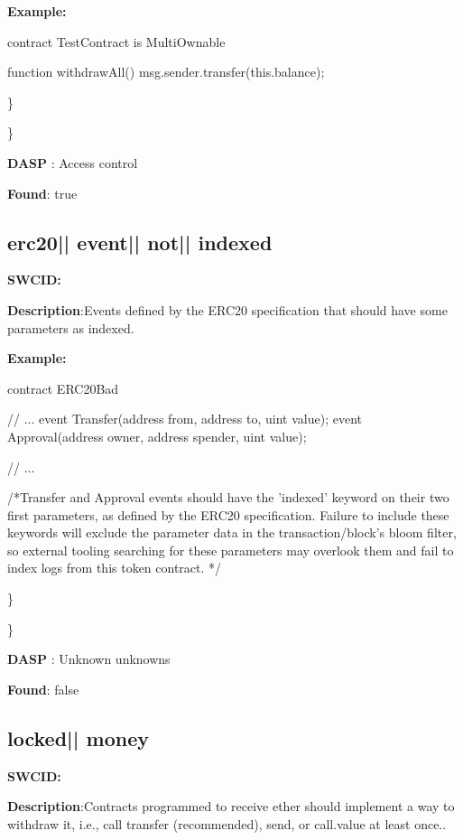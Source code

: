 \documentclass{article}
\begin{document}
\textbf{Example:} 
\begin{ffcode} 

contract TestContract is MultiOwnable {

  function withdrawAll(){
    msg.sender.transfer(this.balance);
  }
}

\end{ffcode} 
\} 

\} 

\textbf{DASP} : Access control

\textbf{Found}: true

\subsection{erc20{|\textunderscore| }event{|\textunderscore| }not{|\textunderscore| }indexed} 
\textbf{SWC{\textunderscore }ID:} 

\textbf{Description}:Events defined by the ERC20 specification that should have some parameters as indexed.


\textbf{Example:} 
\begin{ffcode} 

contract ERC20Bad {
    // ...
    event Transfer(address from, address to, uint value);
    event Approval(address owner, address spender, uint value);

    // ...
}

 /*Transfer and Approval events should have the 'indexed' keyword on their two first parameters, as defined by the ERC20 specification. Failure to include these keywords will exclude the parameter data in the transaction/block's bloom filter, so external tooling searching for these parameters may overlook them and fail to index logs from this token contract. */ 

\end{ffcode} 
\} 

\} 

\textbf{DASP} : Unknown unknowns

\textbf{Found}: false

\subsection{locked{|\textunderscore| }money} 
\textbf{SWC{\textunderscore }ID:} 

\textbf{Description}:Contracts programmed to receive ether should implement a way to withdraw it, i.e., call transfer (recommended), send, or call.value at least once..
\end{document}
